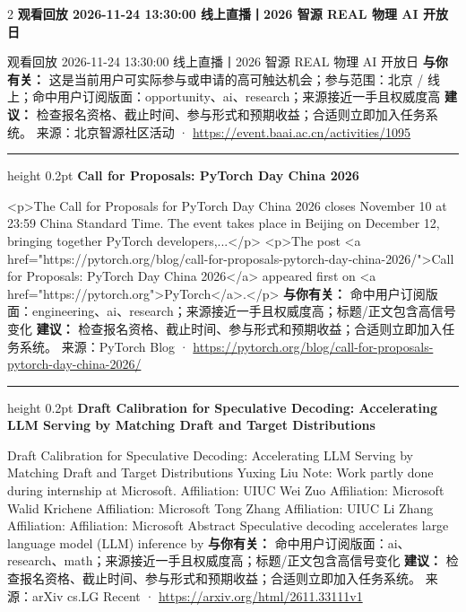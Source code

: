 \documentclass[10.5pt]{ctexart}
\begin{document}
\begin{multicols}{2}
{\large\bfseries 观看回放 2026-11-24 13:30:00 线上直播丨2026 智源 REAL 物理 AI 开放日}\par
观看回放 2026-11-24 13:30:00 线上直播丨2026 智源 REAL 物理 AI 开放日
\textbf{与你有关：} 这是当前用户可实际参与或申请的高可触达机会；参与范围：北京 / 线上；命中用户订阅版面：opportunity、ai、research；来源接近一手且权威度高
\textbf{建议：} 检查报名资格、截止时间、参与形式和预期收益；合适则立即加入任务系统。
{\footnotesize\color{ormuted} 来源：北京智源社区活动 · \url{https://event.baai.ac.cn/activities/1095}}
\vspace{2mm}
\hrule height 0.2pt
\vspace{2mm}
{\large\bfseries Call for Proposals: PyTorch Day China 2026}\par
<p>The Call for Proposals for PyTorch Day China 2026 closes November 10 at 23:59 China Standard Time. The event takes place in Beijing on December 12, bringing together PyTorch developers,...</p> <p>The post <a href="https://pytorch.org/blog/call-for-proposals-pytorch-day-china-2026/">Call for Proposals: PyTorch Day China 2026</a> appeared first on <a href="https://pytorch.org">PyTorch</a>.</p>
\textbf{与你有关：} 命中用户订阅版面：engineering、ai、research；来源接近一手且权威度高；标题/正文包含高信号变化
\textbf{建议：} 检查报名资格、截止时间、参与形式和预期收益；合适则立即加入任务系统。
{\footnotesize\color{ormuted} 来源：PyTorch Blog · \url{https://pytorch.org/blog/call-for-proposals-pytorch-day-china-2026/}}
\vspace{2mm}
\hrule height 0.2pt
\vspace{2mm}
{\large\bfseries Draft Calibration for Speculative Decoding: Accelerating LLM Serving by Matching Draft and Target Distributions}\par
Draft Calibration for Speculative Decoding: Accelerating LLM Serving by Matching Draft and Target Distributions Yuxing Liu Note: Work partly done during internship at Microsoft. Affiliation: UIUC Wei Zuo Affiliation: Microsoft Walid Krichene Affiliation: Microsoft Tong Zhang Affiliation: UIUC Li Zhang Affiliation: Affiliation: Microsoft Abstract Speculative decoding accelerates large language model (LLM) inference by
\textbf{与你有关：} 命中用户订阅版面：ai、research、math；来源接近一手且权威度高；标题/正文包含高信号变化
\textbf{建议：} 检查报名资格、截止时间、参与形式和预期收益；合适则立即加入任务系统。
{\footnotesize\color{ormuted} 来源：arXiv cs.LG Recent · \url{https://arxiv.org/html/2611.33111v1}}
\vspace{2mm}

\end{multicols}
\end{document}
